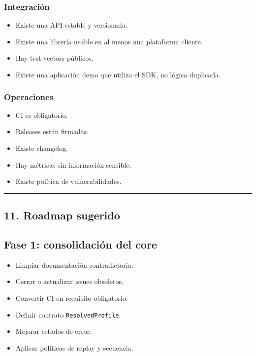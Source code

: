 \documentclass[
]{article}
\providecommand{\tightlist}{%
  \setlength{\itemsep}{0pt}\setlength{\parskip}{0pt}}
\begin{document}
\hypertarget{integraciuxf3n}{%
\subsubsection{Integración}\label{integraciuxf3n}}

\begin{itemize}
\tightlist
\item[$\square$]
  Existe una API estable y versionada.
\item[$\square$]
  Existe una librería usable en al menos una plataforma cliente.
\item[$\square$]
  Hay test vectors públicos.
\item[$\square$]
  Existe una aplicación demo que utiliza el SDK, no lógica duplicada.
\end{itemize}

\hypertarget{operaciones}{%
\subsubsection{Operaciones}\label{operaciones}}

\begin{itemize}
\tightlist
\item[$\square$]
  CI es obligatorio.
\item[$\square$]
  Releases están firmadas.
\item[$\square$]
  Existe changelog.
\item[$\square$]
  Hay métricas sin información sensible.
\item[$\square$]
  Existe política de vulnerabilidades.
\end{itemize}

\begin{center}\rule{0.5\linewidth}{0.5pt}\end{center}

\hypertarget{roadmap-sugerido}{%
\subsection{11. Roadmap sugerido}\label{roadmap-sugerido}}

\hypertarget{fase-1-consolidaciuxf3n-del-core}{%
\subsection{Fase 1: consolidación del
core}\label{fase-1-consolidaciuxf3n-del-core}}

\begin{itemize}
\tightlist
\item
  Limpiar documentación contradictoria.
\item
  Cerrar o actualizar issues obsoletos.
\item
  Convertir CI en requisito obligatorio.
\item
  Definir contrato \texttt{ResolvedProfile}.
\item
  Mejorar estados de error.
\item
  Aplicar políticas de replay y secuencia.
\end{itemize}
\end{document}

